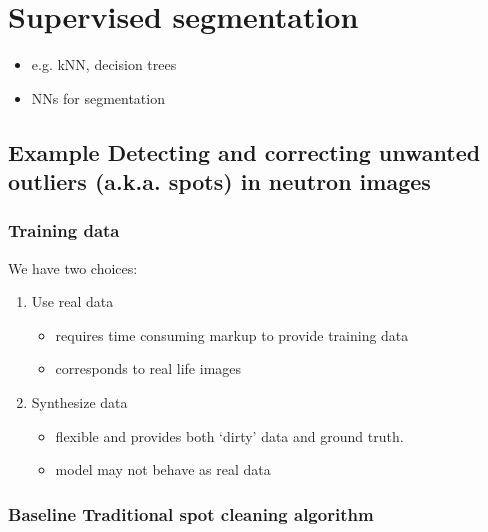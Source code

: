 \documentclass[letterpaper,10pt,english]{sphinxmanual}
\begin{document}
\chapter{Supervised segmentation}
\label{\detokenize{ML4NeutronImageSegmentation:supervised-segmentation}}\begin{itemize}
\item {} 
e.g. k\sphinxhyphen{}NN, decision trees

\item {} 
NNs for segmentation

\end{itemize}


\section{Example \sphinxhyphen{} Detecting and correcting unwanted outliers (a.k.a. spots) in neutron images}
\label{\detokenize{ML4NeutronImageSegmentation:example-detecting-and-correcting-unwanted-outliers-a-k-a-spots-in-neutron-images}}

\subsection{Training data}
\label{\detokenize{ML4NeutronImageSegmentation:training-data}}
We have two choices:
\begin{enumerate}
%
\item {} 
Use real data
\begin{itemize}
\item {} 
requires time consuming markup to provide training data

\item {} 
corresponds to real life images

\end{itemize}

\item {} 
Synthesize data
\begin{itemize}
\item {} 
flexible and provides both ‘dirty’ data and ground truth.

\item {} 
model may not behave as real data

\end{itemize}

\end{enumerate}


\subsection{Baseline \sphinxhyphen{} Traditional spot cleaning algorithm}
\label{\detokenize{ML4NeutronImageSegmentation:baseline-traditional-spot-cleaning-algorithm}}
\end{document}
